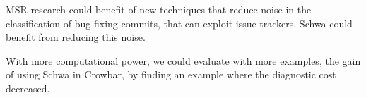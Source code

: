 MSR research could benefit of new techniques that reduce noise in the classification of bug-fixing commits, that can exploit issue trackers. Schwa could benefit from reducing this noise.

With more computational power, we could evaluate with more examples, the gain of using Schwa in Crowbar, by finding an example where the diagnostic cost decreased.